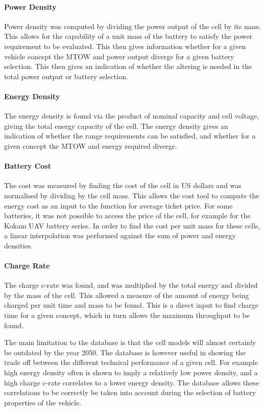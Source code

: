 \paragraph{Power Density} Power density was computed by dividing the power output of the cell by its mass. This allows for the capability of a unit mass of the battery to satisfy the power requirement to be evaluated. This then gives information whether for a given vehicle concept the MTOW and power output diverge for a given battery selection. This then gives an indication of whether the altering is needed in the total power output or battery selection. 
 \paragraph{Energy Density}  The energy density is found via the product of nominal capacity and cell voltage, giving the total energy capacity of the cell. The energy density gives an indication of whether the range requirements can be satisfied, and whether for a given concept the MTOW and energy required diverge.
 \paragraph{Battery Cost} The cost was measured by finding the cost of the cell in US dollars and was normalised by dividing by the cell mass. This allows the cost tool to compute the energy cost as an input to the function for average ticket price. For some batteries, it was not possible to access the price of the cell, for example for the Kokam UAV battery series. In order to find the cost per unit mass for these cells, a linear interpolation was performed against the sum of power and energy densities. 
 \paragraph{Charge Rate} The charge c-rate was found, and was multiplied by the total energy and divided by the mass of the cell. This allowed a measure of the amount of energy being charged per unit time and mass to be found. This is a direct input to find charge time for a given concept, which in turn allows the maximum throughput to be found.  

 The main limitation to the database is that the cell models will almost certainly be outdated by the year 2050. The database is however useful in showing the trade off between the different technical performance of a given cell. For example high energy density often is shown to imply a relatively low power density, and a high charge c-rate correlates to a lower energy density. The database allows these correlations to be correctly be taken into account during the selection of battery properties of the vehicle. 





% 

%


 
